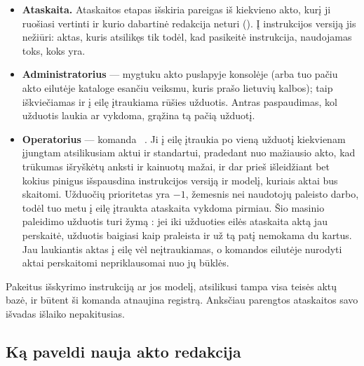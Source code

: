 \begin{itemize}
  \item \textbf{Ataskaita.} Ataskaitos etapas  išskiria pareigas iš kiekvieno
    akto, kurį ji ruošiasi vertinti ir kurio dabartinė redakcija neturi
     (). Į instrukcijos versiją jis
    nežiūri: aktas, kuris atsilikęs tik todėl, kad pasikeitė instrukcija, naudojamas toks, koks
    yra.
  \item \textbf{Administratorius} --- mygtuku  akto puslapyje konsolėje
    (arba tuo pačiu akto eilutėje kataloge esančiu veiksmu, kuris prašo lietuvių kalbos); taip
    iškviečiamas  ir į eilę
    įtraukiama  rūšies užduotis. Antras paspaudimas, kol užduotis laukia ar
    vykdoma, grąžina tą pačią užduotį.
  \item \textbf{Operatorius} --- komanda ~. Ji į eilę
    įtraukia po vieną užduotį kiekvienam įjungtam atsilikusiam aktui ir standartui, pradedant
    nuo mažiausio akto, kad trūkumas išryškėtų anksti ir kainuotų mažai, ir dar prieš išleidžiant
    bet kokius pinigus išspausdina instrukcijos versiją ir modelį, kuriais aktai bus skaitomi.
    Užduočių prioritetas yra $-1$, žemesnis nei naudotojų paleisto darbo, todėl tuo metu į eilę
    įtraukta ataskaita vykdoma pirmiau. Šio masinio paleidimo užduotis turi žymą
    : jei iki užduoties eilės ataskaita aktą jau perskaitė, užduotis baigiasi
    kaip praleista ir už tą patį nemokama du kartus. Jau laukiantis aktas į eilę vėl neįtraukiamas,
    o komandos eilutėje nurodyti aktai perskaitomi nepriklausomai nuo jų būklės.
\end{itemize}

Pakeitus išskyrimo instrukciją ar jos modelį, atsilikusi tampa visa teisės aktų bazė, ir būtent
ši komanda atnaujina registrą. Anksčiau parengtos ataskaitos savo išvadas išlaiko nepakitusias.

\subsection{Ką paveldi nauja akto redakcija}\label{sec:obligations:carry}

